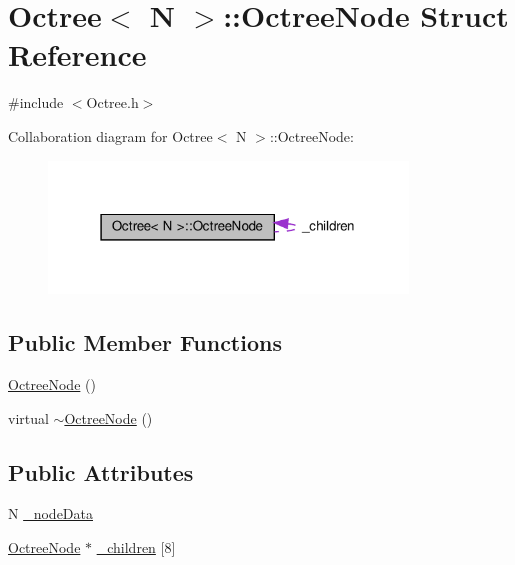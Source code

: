 \hypertarget{structOctree_1_1OctreeNode}{}\section{Octree$<$ N $>$\+:\+:Octree\+Node Struct Reference}
\label{structOctree_1_1OctreeNode}


{\ttfamily \#include $<$Octree.\+h$>$}



Collaboration diagram for Octree$<$ N $>$\+:\+:Octree\+Node\+:
\nopagebreak
\begin{figure}[H]
\begin{center}
\leavevmode
\includegraphics[width=271pt]{structOctree_1_1OctreeNode__coll__graph}
\end{center}
\end{figure}
\subsection*{Public Member Functions}
\begin{DoxyCompactItemize}
\item 
\hyperlink{structOctree_1_1OctreeNode_af85586ea3a494b59ebc0af118753dd69}{Octree\+Node} ()
\item 
virtual \hyperlink{structOctree_1_1OctreeNode_aabb39b4e83e43bacd5c4594aceb676bb}{$\sim$\+Octree\+Node} ()
\end{DoxyCompactItemize}
\subsection*{Public Attributes}
\begin{DoxyCompactItemize}
\item 
N \hyperlink{structOctree_1_1OctreeNode_acf3ff3707042ca6eaf42c6e1b5520376}{\+\_\+node\+Data}
\item 
\hyperlink{structOctree_1_1OctreeNode}{Octree\+Node} $\ast$ \hyperlink{structOctree_1_1OctreeNode_aba66f4dfb079ce3ec748889a7aa7e76d}{\+\_\+children} \mbox{[}8\mbox{]}
\end{DoxyCompactItemize}


